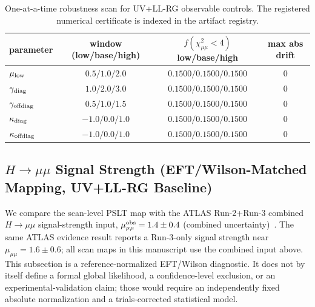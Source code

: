 \documentclass[aps,prd,onecolumn,notitlepage,nofootinbib,superscriptaddress,11pt,floatfix]{revtex4-2}
\begin{document}
\begin{table}[t]
\centering
\caption{One-at-a-time robustness scan for UV+LL-RG observable controls. The registered numerical certificate is indexed in the artifact registry.}
\label{tab:hll_rge_sensitivity}
\small
\begin{tabular}{lccc}
\hline\hline
parameter & window (low/base/high) & $f(\chi^2_{\mu\mu}<4)$ low/base/high & max abs drift \\
\hline
$\mu_{\rm low}$ & $0.5/1.0/2.0$ & $0.1500/0.1500/0.1500$ & $0$ \\
$\gamma_{\rm diag}$ & $1.0/2.0/3.0$ & $0.1500/0.1500/0.1500$ & $0$ \\
$\gamma_{\rm offdiag}$ & $0.5/1.0/1.5$ & $0.1500/0.1500/0.1500$ & $0$ \\
$\kappa_{\rm diag}$ & $-1.0/0.0/1.0$ & $0.1500/0.1500/0.1500$ & $0$ \\
$\kappa_{\rm offdiag}$ & $-1.0/0.0/1.0$ & $0.1500/0.1500/0.1500$ & $0$ \\
\hline\hline
\end{tabular}
\end{table}

\subsection{\texorpdfstring{$H\to\mu\mu$ Signal Strength}{H to mumu Signal Strength} (EFT/Wilson-Matched Mapping, UV+LL-RG Baseline)}
We compare the scan-level PSLT map with the ATLAS Run-2+Run-3 combined $H\to\mu\mu$ signal-strength input, $\mu_{\mu\mu}^{\rm obs}=1.4\pm0.4$ (combined uncertainty)~\cite{ATLAS_Hmumu}. The same ATLAS evidence result reports a Run-3-only signal strength near $\mu_{\mu\mu}=1.6\pm0.6$; all scan maps in this manuscript use the combined input above.
This subsection is a reference-normalized EFT/Wilson diagnostic.  It does not by itself define a formal global likelihood, a confidence-level exclusion, or an experimental-validation claim; those would require an independently fixed absolute normalization and a trials-corrected statistical model.
\end{document}
